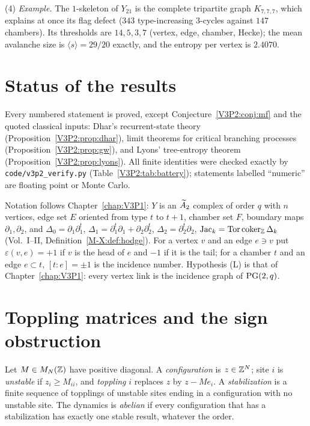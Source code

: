\begin{chapterabstract}
(4) \emph{Example.} The $1$-skeleton of $Y_{21}$ is the complete tripartite graph
$K_{7,7,7}$, which explains at once its flag defect ($343$ type-increasing $3$-cycles against
$147$ chambers). Its thresholds are $14,5,3,7$ (vertex, edge, chamber, Hecke); the mean
avalanche size is $\langle s\rangle=29/20$ exactly, and the entropy per vertex is $2.4070$.
\end{chapterabstract}

\section*{Status of the results}

Every numbered statement is proved, except Conjecture~\ref{V3P2:conj:mf} and the quoted
classical inputs: Dhar's recurrent-state theory \cite{Dhar90} (Proposition~\ref{V3P2:prop:dhar}),
limit theorems for critical branching processes \cite{Harris63}
(Proposition~\ref{V3P2:prop:gw}), and Lyons' tree-entropy theorem \cite{Lyons2005}
(Proposition~\ref{V3P2:prop:lyons}). All finite identities were checked exactly by
\texttt{code/v3p2\_verify.py} (Table~\ref{V3P2:tab:battery}); statements labelled
``numeric'' are floating point or Monte Carlo.

Notation follows Chapter~\ref{chap:V3P1}: $Y$ is an $\widetilde A_2$ complex of order $q$ with $n$ vertices, edge set
$E$ oriented from type $t$ to $t+1$, chamber set $F$, boundary maps $\partial_1,\partial_2$,
and $\Delta_0=\partial_1\partial_1^{t}$,
$\Delta_1=\partial_1^{t}\partial_1+\partial_2\partial_2^{t}$, $\Delta_2=\partial_2^{t}\partial_2$,
$\operatorname{Jac}_k=\operatorname{Tor}\operatorname{coker}_{\mathbb{Z}}\Delta_k$ (Vol.~I--II, Definition~\ref{M-X:def:hodge}). For a vertex $v$
and an edge $e\ni v$ put $\varepsilon(v,e)=+1$ if $v$ is the head of $e$ and $-1$ if it is
the tail; for a chamber $t$ and an edge $e\subset t$, $[t:e]=\pm1$ is the incidence number.
Hypothesis (L) is that of Chapter~\ref{chap:V3P1}: every vertex link is the incidence graph of $\mathrm{PG}(2,q)$.

\section{Toppling matrices and the sign obstruction}\label{V3P2:sec:sign}

\begin{definition}\label{V3P2:def:toppling}
Let $M\in M_N(\mathbb{Z})$ have positive diagonal. A \emph{configuration} is $z\in\mathbb{Z}^{N}$; site $i$
is \emph{unstable} if $z_i\ge M_{ii}$, and \emph{toppling} $i$ replaces $z$ by $z-Me_i$.
A \emph{stabilization} is a finite sequence of topplings of unstable sites ending in a
configuration with no unstable site. The dynamics is \emph{abelian} if every configuration
that has a stabilization has exactly one stable result, whatever the order.
\end{definition}

